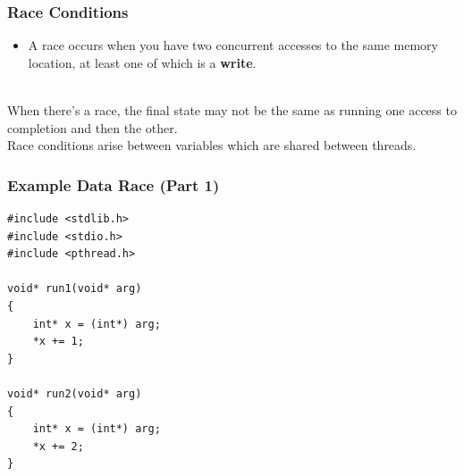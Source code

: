 \documentclass[aspectratio=43]{beamer}
\newenvironment{changemargin}[1]{%
  \begin{list}{}{%
    \setlength{\topsep}{0pt}%
    \setlength{\leftmargin}{#1}%
    \setlength{\rightmargin}{1em}
    \setlength{\listparindent}{\parindent}%
    \setlength{\itemindent}{\parindent}%
    \setlength{\parsep}{\parskip}%
  }%
  \item[]}{\end{list}}
\begin{document}
\begin{frame}
  \frametitle{Race Conditions}

  \begin{changemargin}{2.5cm}
  \begin{itemize}
    \item A race occurs when you have two concurrent accesses to the
      same memory location, at least one of which is a {\bf write}.
  \end{itemize}~\\

   When there's a race, the final state may not be the same as
      running one access to completion and then the other.\\[1em]
   Race conditions arise between variables which
      are shared between threads.
  \end{changemargin}

\end{frame}

\begin{frame}[fragile]
  \frametitle{Example Data Race (Part 1)}

  \begin{changemargin}{2.5cm}
  \begin{lstlisting}
#include <stdlib.h>
#include <stdio.h>
#include <pthread.h>

void* run1(void* arg)
{
    int* x = (int*) arg;
    *x += 1;
}

void* run2(void* arg)
{
    int* x = (int*) arg;
    *x += 2;
}
  \end{lstlisting}
\end{changemargin}
\end{frame}
\end{document}
